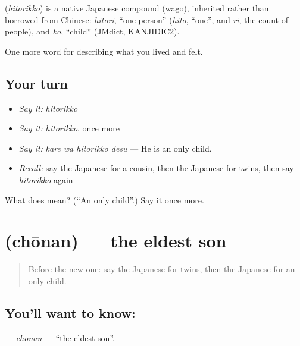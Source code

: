 \begin{cousinweb}
\textbf{} (\emph{hitorikko}) is a native Japanese compound (wago), inherited rather than borrowed from Chinese: \emph{hitori}, \textquotedblleft{}one person\textquotedblright{} (\emph{hito}, \textquotedblleft{}one\textquotedblright{}, and \emph{ri}, the count of people), and \emph{ko}, \textquotedblleft{}child\textquotedblright{} (JMdict, KANJIDIC2).
\end{cousinweb}

\begin{grammarlens}[title={What you've built}]
One more word for describing what you lived and felt.
\end{grammarlens}

\subsection*{Your turn}
\begin{itemize}
\raggedright
  \item \emph{Say it:} \emph{hitorikko}
  \item \emph{Say it:} \emph{hitorikko}, once more
  \item \emph{Say it:} \emph{kare wa hitorikko desu} — He is an only child.
  \item \emph{Recall:} say the Japanese for a cousin, then the Japanese for twins, then say \emph{hitorikko} again
\end{itemize}

\begin{tcolorbox}[breakable,colback=teal!4,colframe=teal!35!black,title={Before you move on}]
What does  mean? (\textquotedblleft{}An only child\textquotedblright{}.) Say it once more.
\end{tcolorbox}
\section[\texorpdfstring{\ja{ちょうなん} (chōnan)}{ちょうなん (chōnan)}]{ (chōnan) — the eldest son}

\label{lesson:JA-C476-chounan}



\begin{quote}
Before the new one: say the Japanese for twins, then the Japanese for an only child.
\end{quote}

\subsection*{You'll want to know: }
\textbf{} — \emph{chōnan} — \textquotedblleft{}the eldest son\textquotedblright{}.

